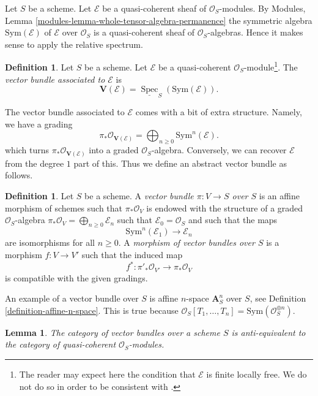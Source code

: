 \documentclass{stacks-project}
\theoremstyle{plain}
\newtheorem{lemma}[subsection]{Lemma}
\theoremstyle{definition}
\newtheorem{definition}[subsection]{Definition}
\theoremstyle{remark}
\numberwithin{equation}{subsection}
\def\Spec{\mathop{\mathrm{Spec}}}
\begin{document}
\noindent
Let $S$ be a scheme.
Let $\mathcal{E}$ be a quasi-coherent sheaf of $\mathcal{O}_S$-modules.
By Modules, Lemma \ref{modules-lemma-whole-tensor-algebra-permanence}
the symmetric algebra $\text{Sym}(\mathcal{E})$ of
$\mathcal{E}$ over $\mathcal{O}_S$
is a quasi-coherent sheaf of $\mathcal{O}_S$-algebras.
Hence it makes sense to apply the relative spectrum.

\begin{definition}
\label{definition-vector-bundle}
Let $S$ be a scheme. Let $\mathcal{E}$ be a quasi-coherent
$\mathcal{O}_S$-module\footnote{The reader may expect here
the condition that $\mathcal{E}$ is finite locally free. We do not
do so in order to be consistent with \cite[II, Definition 1.7.8]{EGA}.}.
The {\it vector bundle associated to $\mathcal{E}$} is
$$
\mathbf{V}(\mathcal{E}) = \underline{\Spec}_S(\text{Sym}(\mathcal{E})).
$$
\end{definition}

\noindent
The vector bundle associated to $\mathcal{E}$ comes with a bit
of extra structure. Namely, we have a grading
$$
\pi_*\mathcal{O}_{\mathbf{V}(\mathcal{E})} =
\bigoplus\nolimits_{n \geq 0} \text{Sym}^n(\mathcal{E}).
$$
which turns $\pi_*\mathcal{O}_{\mathbf{V}(\mathcal{E})}$
into a graded $\mathcal{O}_S$-algebra. Conversely, we can recover
$\mathcal{E}$ from the degree $1$ part of this.
Thus we define an abstract vector bundle as follows.

\begin{definition}
\label{definition-abstract-vector-bundle}
Let $S$ be a scheme. A {\it vector bundle $\pi : V \to S$ over $S$} is an
affine morphism of schemes such that $\pi_*\mathcal{O}_V$ is endowed with
the structure of a graded $\mathcal{O}_S$-algebra
$\pi_*\mathcal{O}_V = \bigoplus\nolimits_{n \geq 0} \mathcal{E}_n$
such that $\mathcal{E}_0 = \mathcal{O}_S$ and such that the maps
$$
\text{Sym}^n(\mathcal{E}_1) \longrightarrow \mathcal{E}_n
$$
are isomorphisms for all $n \geq 0$. A {\it morphism of vector bundles
over $S$} is a morphism $f : V \to V'$ such that the induced map
$$
f^* : \pi'_*\mathcal{O}_{V'} \longrightarrow \pi_*\mathcal{O}_V
$$
is compatible with the given gradings.
\end{definition}

\noindent
An example of a vector bundle over $S$ is affine $n$-space
$\mathbf{A}^n_S$ over $S$, see Definition \ref{definition-affine-n-space}.
This is true because
$\mathcal{O}_S[T_1, \ldots, T_n] = \text{Sym}(\mathcal{O}_S^{\oplus n})$.

\begin{lemma}
\label{lemma-category-vector-bundles}
The category of vector bundles over a scheme $S$ is
anti-equivalent to the category of quasi-coherent $\mathcal{O}_S$-modules.
\end{lemma}
\end{document}
